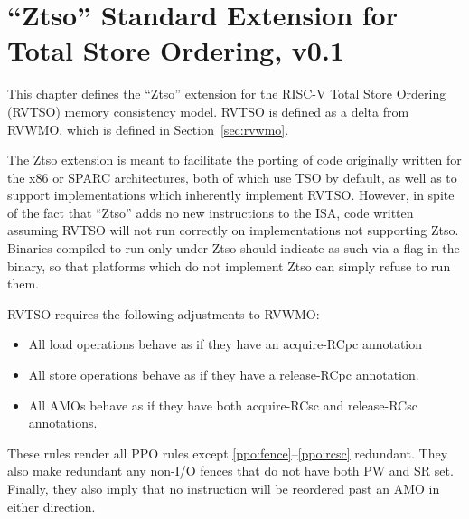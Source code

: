 \chapter{``Ztso'' Standard Extension for Total Store Ordering, v0.1}
\label{sec:ztso}

This chapter defines the ``Ztso'' extension for the RISC-V Total Store Ordering (RVTSO) memory consistency model.
RVTSO is defined as a delta from RVWMO, which is defined in Section~\ref{sec:rvwmo}.

\begin{commentary}
  The Ztso extension is meant to facilitate the porting of code originally written for the x86 or SPARC architectures, both of which use TSO by default, as well as to support implementations which inherently implement RVTSO.
  However, in spite of the fact that ``Ztso'' adds no new instructions to the ISA, code written assuming RVTSO will not run correctly on implementations not supporting Ztso.
  Binaries compiled to run only under Ztso should indicate as such via a flag in the binary, so that platforms which do not implement Ztso can simply refuse to run them.
\end{commentary}

RVTSO requires the following adjustments to RVWMO:

\begin{itemize}
  \item All load operations behave as if they have an acquire-RCpc annotation
  \item All store operations behave as if they have a release-RCpc annotation.
  \item All AMOs behave as if they have both acquire-RCsc and release-RCsc annotations.
\end{itemize}

These rules render all PPO rules except \ref{ppo:fence}--\ref{ppo:rcsc} redundant.
They also make redundant any non-I/O fences that do not have both PW and SR set.
Finally, they also imply that no instruction will be reordered past an AMO in either direction.
